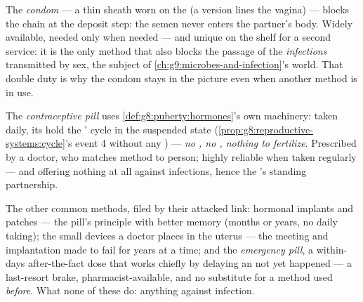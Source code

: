 \begin{definition}\label{def:g8:contraception:condom}
The \emph{condom} --- a thin sheath worn on
the  (a  version lines the vagina) --- blocks
the chain at the deposit step: the semen never enters the
partner's body. Widely available, needed only when needed
--- and unique on the shelf for a second service: it is
the only method that also blocks the passage of the
\emph{infections} transmitted by sex, the subject of
\cref{ch:g9:microbes-and-infection}'s world. That double
duty is why the condom stays in the picture even when
another method is in use.
\end{definition}

\begin{definition}\label{def:g8:contraception:pill}
The \emph{contraceptive pill}
uses \cref{def:g8:puberty:hormones}'s own machinery: taken
daily, its  hold the ' cycle in the
suspended state
(\cref{prop:g8:reproductive-systems:cycle}'s event 4
without any ) --- \emph{no , no , nothing to fertilize}. Prescribed by a doctor, who
matches method to person; highly reliable when taken
regularly --- and offering nothing at all against
infections, hence the 's standing partnership.
\end{definition}

\begin{example}\label{ex:g8:contraception:shelf}
The other common methods, filed by their attacked link:
hormonal implants and patches --- the pill's principle
with better memory (months or years, no daily taking);
the small devices a doctor places in the uterus --- the
meeting and implantation made to fail for years at a
time; and the \emph{emergency pill}, a within-days
after-the-fact  dose that works chiefly by
delaying an  not yet happened --- a
last-resort brake, pharmacist-available, and no
substitute for a method used \emph{before}. What none of
these do: anything against infection.
\end{example}

